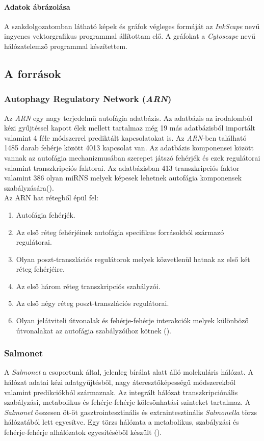 \documentclass[a4paper,12pt]{article}
\begin{document}
			\paragraph{Adatok ábrázolása}
			A szakdolgozatomban látható képek és gráfok végleges formáját az \textit{InkScape} nevű ingyenes vektorgrafikus programmal állítottam elő. A gráfokat a \textit{Cytoscape} nevű hálózatelemző programmal készítettem.
			
\subsection{A források}
			
			\subsubsection{Autophagy Regulatory Network (\textit{ARN})}
			Az \textit{ARN} egy nagy terjedelmű autofágia adatbázis. Az adatbázis az irodalomból kézi gyűjtéssel kapott élek mellett tartalmaz még 19 más adatbázisból importált valamint 4 féle módszerrel prediktált kapcsolatokat is. Az \textit{ARN}-ben található 1485 darab fehérje között 4013 kapcsolat van. Az adatbázis komponensei között vannak az autofágia mechanizmusában szerepet játszó fehérjék és ezek regulátorai valamint transzkripciós faktorai. Az adatbázisban 413 transzkripciós faktor valamint 386 olyan miRNS melyek képesek lehetnek autofágia komponensek szabályzására(\cite{ARN}). \\
			Az ARN hat rétegből épül fel:
			\begin{enumerate}
				\item Autofágia fehérjék.
				\item Az első réteg fehérjéinek autofágia specifikus forrásokból származó regulátorai.
				\item Olyan poszt-transzlációs regulátorok melyek közvetlenül hatnak az első két réteg fehérjéire.
				\item Az első három réteg transzkripciós szabályzói.
				\item Az első négy réteg poszt-transzlációs regulátorai.
				\item Olyan jelátviteli útvonalak és fehérje-fehérje interakciók melyek különböző útvonalakat az autofágia szabályzóihoz kötnek (\cite{ARN}).
			\end{enumerate} 
					
			\subsubsection{Salmonet} 
			A \textit{Salmonet} a csoportunk által, jelenleg bírálat alatt álló molekuláris hálózat. A hálózat adatai kézi adatgyűjtésből, nagy áteresztőképességű módszerekből valamint predikciókból származnak. Az  integrált hálózat transzkripciónális szabályzási, metabolikus és fehérje-fehérje kölcsönhatási szinteket tartalmaz. A \textit{Salmonet} összesen öt-öt gasztrointesztinális és extraintesztinális \textit{Salmonella} törzs hálózatából lett egyesítve. Egy törzs hálózata a metabolikus, szabályzási és fehérje-fehérje alhálózatok egyesítéséből készült (\cite{salmonet}).
			
\end{document}

